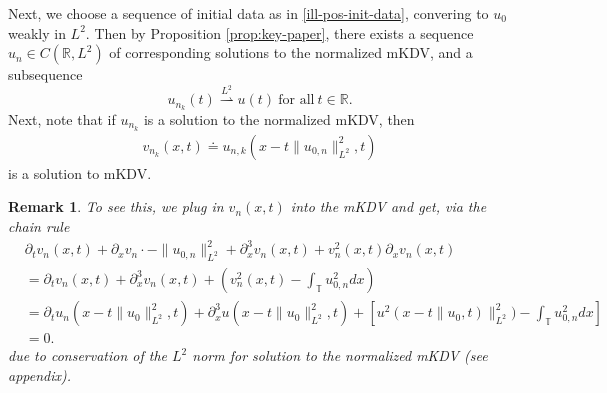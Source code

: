 \documentclass[12pt,reqno]{amsart}
\numberwithin{equation}{section}  %
\newcommand{\rr}{\mathbb{R}}
\newcommand{\ci}{\mathbb{T}}
\newcommand{\p}{\partial}
\newtheorem{remark}[theorem]{Remark}
\begin{document}
%
%
%
%
%
%
%
%
%
%
Next, we choose a sequence of initial data as in \eqref{ill-pos-init-data},
convering to $u_{0}$ weakly in $L^{2}$.  
Then by Proposition \ref{prop:key-paper}, there exists a sequence
$u_{n} \in C(\rr, L^{2})$ of corresponding solutions to the normalized mKDV, and
a subsequence 
\begin{equation*}
  u_{n_{k}}(t) \overset{L^{2}}{\rightharpoonup} u(t) \ \text{for
all} \ t \in \rr.
\end{equation*}
Next, note that if $u_{n_{k}}$ is a solution to the
normalized mKDV, then  
%
\begin{equation}
  \label{mkdv-sol}
\begin{split}
  v_{n_{k}}(x,t) \doteq u_{n,k}\left( x - t \| u_{0,n} \|^{2}_{L^{2}}, t \right)
\end{split}
\end{equation}
%
%
is a solution to mKDV. 
\begin{framed}
  \begin{remark}
    \label{rem:key-comp}
    To see this, we plug in
$v_{n}(x,t)$ into the mKDV and get, via the chain rule
%
%
\begin{equation*}
\begin{split}
  & \p_{t} v_{n}(x,t) + \p_{x} v_{n} \cdot -\| u_{0,n} \|_{L^{2}}^{2} +
  \p_{x}^{3} v_{n}(x,t) + v_{n}^{2}(x,t) \p_{x} v_{n}(x,t)
  \\
  & = \p_{t} v_{n}(x,t) + \p_{x}^{3} v_{n}(x,t) + \left( v_{n}^{2}(x,t) -
  \int_{\ci} u_{0,n}^{2} dx \right)
  \\
  & = \p_{t} u_{n}(x - t \| u_{0} \|^{2}_{L^{2}},t) + \p_{x}^{3} u(x - t \|
  u_{0} \|^{2}_{L^{2}},t) + \left[ u^{2}(x - t \| u_{0},t) \|^{2}_{L^{2}}) -
  \int_{\ci} u^{2}_{0,n} dx \right]
  \\
  & = 0.
\end{split}
\end{equation*}
%
%
due to conservation of the $L^{2}$ norm for solution to the normalized mKDV (see
appendix).
\end{remark}
\end{framed}
\end{document}
